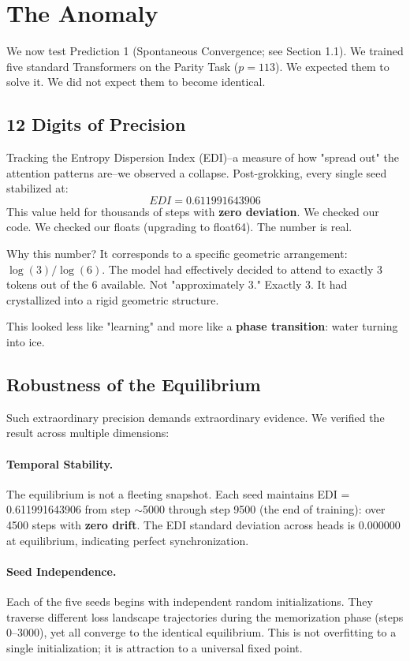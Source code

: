 \section{The Anomaly}\label{sec:anomaly}

We now test Prediction 1 (Spontaneous Convergence; see Section 1.1). We trained five standard Transformers on the Parity Task ($p=113$). We expected them to solve it. We did not expect them to become identical.

\subsection{12 Digits of Precision}

Tracking the Entropy Dispersion Index (EDI)--a measure of how "spread out" the attention patterns are--we observed a collapse. Post-grokking, every single seed stabilized at:
\[ EDI = 0.611991643906 \]
This value held for thousands of steps with \textbf{zero deviation}. We checked our code. We checked our floats (upgrading to float64). The number is real.

Why this number? It corresponds to a specific geometric arrangement: $\log(3)/\log(6)$. The model had effectively decided to attend to exactly 3 tokens out of the 6 available. Not "approximately 3." Exactly 3. It had crystallized into a rigid geometric structure.

This looked less like "learning" and more like a \textbf{phase transition}: water turning into ice.

\subsection{Robustness of the Equilibrium}

Such extraordinary precision demands extraordinary evidence. We verified the result across multiple dimensions:

\paragraph{Temporal Stability.}
The equilibrium is not a fleeting snapshot. Each seed maintains EDI = 0.611991643906 from step $\sim$5000 through step 9500 (the end of training): over 4500 steps with \textbf{zero drift}. The EDI standard deviation across heads is 0.000000 at equilibrium, indicating perfect synchronization.

\paragraph{Seed Independence.}
Each of the five seeds begins with independent random initializations. They traverse different loss landscape trajectories during the memorization phase (steps 0--3000), yet all converge to the identical equilibrium. This is not overfitting to a single initialization; it is attraction to a universal fixed point.

